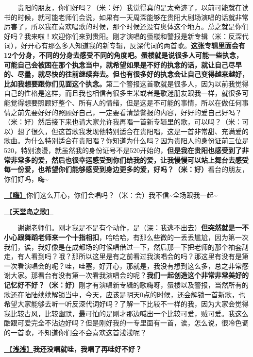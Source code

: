 \documentclass[]{ctexbook}
\begin{document}
  贵阳的朋友，你们好吗？（米：好）我觉得真的是太奇迹了，以前可能就在读书的时候，就可能老师们会说，如果有一天周深能够在贵阳大剧场演唱的话就非常厉害了，所以我在喜欢唱歌的时候，那个时候还没有奥体这个地方。总之就是你们好吗？我来啦！欢迎你们来到贵阳。刚才演唱的蜃楼和警报是新专辑（米：反深代词），好开心有那么多人知道我的新专辑，反深代词的两首歌。\textbf{这张专辑里面会有12个分身，不同的分身去感受不同的角度吧。蜃楼就是说很多人可能一些执念，可能自己会被困在那个执念当中，就希望如果是不好的执念的话，就让自己尽早的、尽量，就尽快的往前继续奔去。但也有很多好的执念会让自己变得越来越好，比如我想要跟你们见面这个执念。}第二个警报这首歌就是很多人，因为以前我觉得自己的性格是这样，而且我也相信有很多生米或者是歌迷朋友跟我一样，就很多可能觉得想要照顾好整个、所有人的情绪，但是这是不可能的事情，所以在做任何事情之前先要好好的照顾好自己，一定要看清楚警报的内容，好好的爱自己好吗？（米：好）然后接下来也请大家允许我再唱一首新专辑里的歌，可以吗？（米：可以）想了很久，但这首歌我发现他特别适合在贵阳唱，这是一首非常甜、充满爱的歌曲。为什么特别适合在贵阳唱？你知道为什么吗？因为贵阳人的身份证前三位是520，特别浪漫，就虽然我的身份证号不是520开始的，\textbf{但是我在贵阳也感受到了非常非常多的爱，然后也很幸运感受到你们给我的爱，让我慢慢可以站上舞台去感受每一份爱，也希望你们能够感受到身边更多的爱，好吗？（米：好）}看台的朋友，你们好吗，嗨\textasciitilde{}

\hyperref[say-hi]{🎵【\textbf{嗨}】}你们这么开心，你们会唱吗？（米：会）我不信\textasciitilde 全场跟我一起\textasciitilde{}

\hyperref[haven-song]{🎵【\textbf{天堂岛之歌}】}

  谢谢老师们。刚才我是不是有个动作，是（深：我逃不出去）\textbf{但突然就是一不小心跟舞蹈老师来一个十指相扣}，哈哈哈，有那么些微的一丢丢尴尬，因为第一次我们，诶，我好像是在成都场的时候唱借过一下，然后那一下把老师的那个袖套刮走，有人看到吗？哦？那所以这里是有之前看过我演唱会的吗？那这里有没有是第一次看演唱会的呢？哇，哇塞，好开心，那就是，我没有想到这么多，总之非常感谢大家。那看台有没有第一次看我演唱会的呢？\textbf{我们一起创造这个非常非常美好的记忆好不好？（米：好）}刚才有演唱新专辑的歌嗨呀，蜃楼以及警报，当然所有的歌还在陆陆续续解锁当中，今天，应该是明天0点的时候，还会解锁一首新歌，也希望大家能够去听一听反深代词好吗？了解一下比较不一样的我，因为大家会觉得我比较古风，比较幽默，最可怕的是刚才那边喊出一个比较可爱，贼可爱。我这么酷跟可爱完全不沾边好吗？但是刚好我的一专里面有一首，诶，怎么说，很冷色调的一首歌，不知道你们会不会喜欢这首浅浅呢？

\hyperref[qianqian]{🎵【\textbf{浅浅}】}\textbf{我还没唱就哇，我唱了再哇好不好？}
\end{document}
